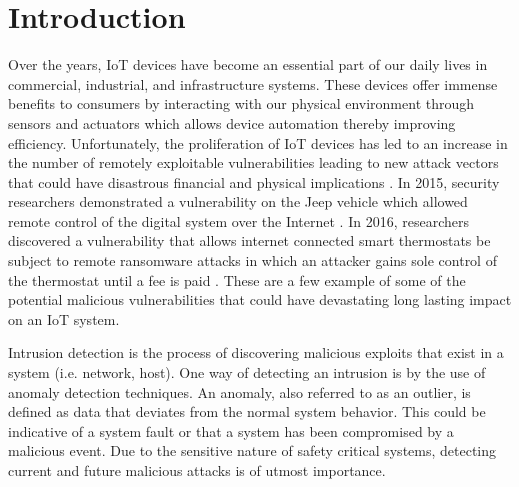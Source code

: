 \section{Introduction}

Over the years, IoT devices have become an essential part of our daily lives in commercial, industrial, and infrastructure systems. These devices offer immense benefits to consumers by interacting with our physical environment through sensors and actuators which allows device automation thereby improving efficiency. Unfortunately, the proliferation of IoT devices has led to an increase in the number of remotely exploitable vulnerabilities leading to new attack vectors that could have disastrous financial and physical implications \cite{barcena2015insecurity}. In 2015, security researchers demonstrated a vulnerability on the Jeep vehicle which allowed remote control of the digital system over the Internet \cite{jeep_vulnerabilty}. In 2016, researchers discovered a vulnerability that allows internet connected smart thermostats be subject to remote ransomware attacks in which an attacker gains sole control of the thermostat until a fee is paid \cite{smart_thermostat}. These are a few example of some of the potential malicious vulnerabilities that could have devastating long lasting impact on an IoT system. \par Intrusion detection \cite{Lazarevic2005} is the process of discovering malicious exploits that exist in a system (i.e. network, host). One way of detecting an intrusion is by the use of anomaly detection techniques. An anomaly, also referred to as an outlier, is defined as data that deviates from the normal system behavior. This could be indicative of a system fault or that a system has been compromised by a malicious event. Due to the sensitive nature of safety critical systems, detecting current and future malicious attacks is of utmost importance.

 




